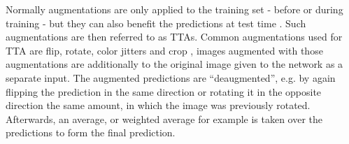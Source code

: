 Normally augmentations are only applied to the training set - before or during training - but they can also benefit the predictions at test time \cite{tta_segmentation_cells}\cite{when_tta_works}.
Such augmentations are then referred to as \acp{TTA}.
Common augmentations used for \ac{TTA} are flip, rotate, color jitters and crop \cite{when_tta_works}, images augmented with those augmentations are additionally to the original image given to the network as a separate input.
The augmented predictions are ``deaugmented'', e.g. by again flipping the prediction in the same direction or rotating it in the opposite direction the same amount, in which the image was previously rotated.
Afterwards, an average, or weighted average for example is taken over the predictions to form the final prediction.

